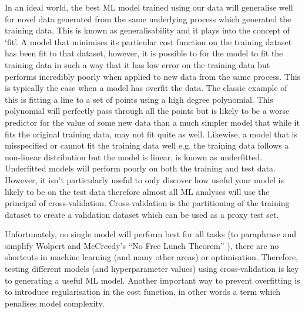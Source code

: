 In an ideal world, the best ML model trained using our data will generalise well for novel data generated from the same underlying process
which generated the training data.  This is known as generalisability and it plays into the concept of `fit'.  A model that minimises 
its particular cost function on the training dataset has been fit to that dataset, however, it is possible to for the model to fit the training
data in such a way that it has low error on the training data but performs incredibly poorly when applied to new data from the same process.
This is typically the case when a model has overfit the data.  The classic example of this is fitting a line to a set of points using a
high degree polynomial.  This polynomial will perfectly pass through all the points but is likely to be a worse predictor for the value 
of some new data than a much simpler model that while it fits the original training data, may not fit quite as well.  Likewise, a model that is misspecified
or cannot fit the training data well e.g. the training data follows a non-linear distribution but the model is linear, is known as underfitted.
Underfitted models will perform poorly on both the training and test data.  However, it isn't particularly useful to only discover
how useful your model is likely to be on the test data therefore almost all ML analyses will use the principal of cross-validation.
Cross-validation is the partitioning of the training dataset to create a validation dataset which can be used as a proxy test set.

Unfortunately, no single model will perform best for all tasks (to paraphrase and simplify Wolpert and McCreedy's ``No Free Lunch Theorem'' \citep{Wolpert1996}),
there are no shortcuts in machine learning (and many other areas) or optimisation.  Therefore, testing different models (and hyperparameter values) using
cross-validation is key to generating a useful ML model.  Another important way to prevent overfitting is to introduce regularisation in the cost function, in other
words a term which penalises model complexity.



